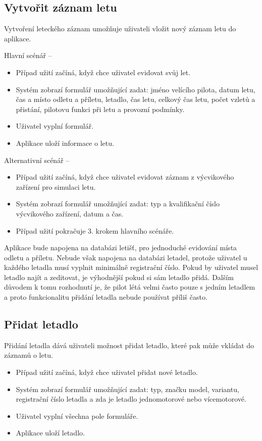 \documentclass[thesis=M,czech]{FITthesis}[2012/06/26]
\begin{document}
\subsection{Vytvořit záznam letu}
Vytvoření leteckého záznam umožňuje uživateli vložit nový záznam letu do aplikace.

Hlavní scénář --
\begin{itemize}
\item Případ užití začíná, když chce uživatel evidovat svůj let.
\item Systém zobrazí formulář umožňující zadat: jméno velícího pilota, datum letu, čas a místo odletu a příletu, letadlo, čas letu, celkový čas letu, počet vzletů a přistání, pilotovu funkci při letu a provozní podmínky.
\item Uživatel vyplní formulář.
\item Aplikace uloží informace o letu.
\end{itemize}

Alternativní scénář --
\begin{itemize}
\item Případ užití začíná, když chce uživatel evidovat záznam z výcvikového zařízení pro simulaci letu.
\item Systém zobrazí formulář umožňující zadat: typ a kvalifikační číslo výcvikového zařízení, datum a čas.
\item Případ užití pokračuje 3. krokem hlavního scénáře.
\end{itemize}

Aplikace bude napojena na databázi letišť, pro jednoduché evidování místa odletu a příletu. Nebude však napojena na databázi letadel, protože uživatel u každého letadla musí vyplnit minimálně registrační číslo. Pokud by uživatel musel letadlo najít a zeditovat, je výhodnější pokud si sám letadlo přidá. Dalším důvodem k tomu rozhodnutí je, že pilot létá velmi často pouze s jedním letadlem a proto funkcionalitu přidání letadla nebude používat příliš často.

\subsection{Přidat letadlo}
Přidání letadla dává uživateli možnost přidat letadlo, které pak může vkládat do záznamů o letu.

\begin{itemize}
\item Případ užití začíná, když chce uživatel přidat nové letadlo.
\item Systém zobrazí formulář  umožňující zadat: typ, značku model, variantu, registrační číslo letadla a zda je letadlo jednomotorové nebo vícemotorové.
\item Uživatel vyplní všechna pole formuláře.
\item Aplikace uloží letadlo.
\end{itemize}
\end{document}
